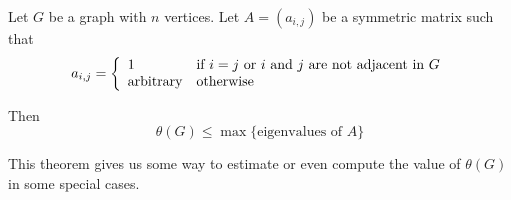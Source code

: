 \documentclass{beamer}
\begin{document}
                  \begin{frame}
                        \begin{theorem}
                              Let $ G $ be a graph with $ n $ vertices. Let $A=(a_{i,j})$ be a symmetric matrix such that
                              \begin{equation}
                                    a_{i,j} = \left\{
                                          \begin{array}{ll}
                                                1 & \text{if $ i = j $ or $ i $ and $ j $ are not adjacent in $ G $} \\
                                                \text{arbitrary} & \text{otherwise}
                                          \end{array}
                                    \right.
                              \end{equation} 

                              Then
                              \begin{equation}
                                    \theta(G) \le \max\{\text{eigenvalues of $A$}\}
                              \end{equation}
                        \end{theorem}

                        This theorem gives us some way to estimate or even compute the value of $\theta(G)$ in some special cases.
                  \end{frame}
\end{document}
